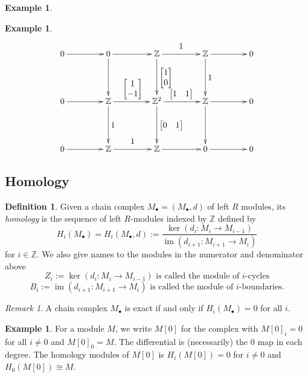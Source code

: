 \documentclass{amsart}[12pt]
\def\image{\operatorname{im}}
\def\im{\image}
\def\ker{\operatorname{ker}}
\newcommand{\Z}{\mathbb{Z}}
\newcommand{\DEF}[1]{\emph{#1}\index{#1}}
\numberwithin{equation}{section}
\theoremstyle{plain} %
\theoremstyle{definition}
\newtheorem{defn}[equation]{Definition}
\newtheorem{ex}[equation]{Example}
\theoremstyle{remark}
\newtheorem{rem}[equation]{Remark}
\newcommand{\ssec}[1]{\subsection{#1}}
\begin{document}
\begin{ex}
\begin{ex}
    \[\xymatrix@R=15mm@C=15mm{
     0 \ar[r] & 0 \ar[r] \ar[d] &\Z \ar[r]^{\begin{matrix} 1\end{matrix}} \ar[d]^{\begin{bmatrix}1 \\ 0\end{bmatrix}} & \Z \ar[r]\ar[d]^{\begin{matrix} 1\end{matrix}}  &  0       \\
    0 \ar[r] & \Z \ar[r]^{\begin{bmatrix} 1 \\ -1 \end{bmatrix}} \ar[d]^{\begin{matrix} 1\end{matrix}} & \Z^2 \ar[r]^{\begin{bmatrix} 1 & 1 \end{bmatrix}} \ar[d]^{\begin{bmatrix} 0 & 1\end{bmatrix}} & \Z \ar[r]\ar[d] & 0     \\
    0 \ar[r] & \Z \ar[r]^{\begin{matrix} 1\end{matrix}} & \Z \ar[r]  & 0 \ar[r] & 0}\]
    \end{ex}
    
    
       \ssec{Homology}
    
    \begin{defn} 
    Given a chain complex $M_\bullet = (M_\bullet, d)$ of left $R$ modules, its \DEF{homology} is the sequence of left $R$-modules indexed by $\Z$ defined by
    $$
    H_i(M_\bullet) = H_i(M_\bullet,d) := \frac{\ker(d_i: M_i \to M_{i-1})}{\im(d_{i+1}: M_{i+1} \to M_{i})}
    $$
    for $i \in \Z$. 
We also give names to the modules in the numerator and denominator above    
\[ Z_i:=\ker(d_i: M_i \to M_{i-1}) \text{ is called the module of $i$-cycles}\]
\[ B_i:=\im(d_{i+1}: M_{i+1} \to M_{i}) \text{ is called the module of $i$-boundaries}.\]
\end{defn}


\begin{rem}
A chain complex $M_\bullet$ is exact if and only if  $H_i(M_\bullet) = 0$ for all $i$.
\end{rem}


\begin{ex} For a module $M$, we write $M[0]$ for the complex with $M[0]_i = 0$ for all $i \ne 0$ and $M[0]_0 = M$. The differential is (necessarily) the $0$ map
  in each degree. The homology modules of $M[0]$ is $H_i(M[0]) = 0$ for $i \ne 0$ and $H_0(M[0]) \cong M$. 
\end{ex}




\end{ex}
\end{document}
